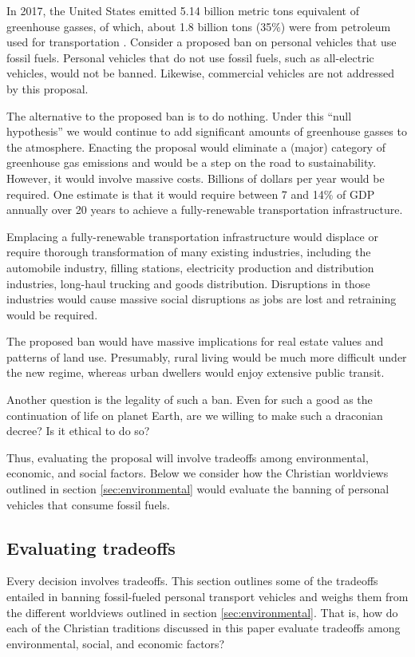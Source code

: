 \documentclass[12pt]{article}
\begin{document}
In 2017, the United States emitted 5.14 billion metric tons equivalent of greenhouse gasses, of which, 
about 1.8 billion tons (35\%) were from petroleum used for transportation \cite{EIA2017}.
Consider a proposed ban on personal vehicles that use fossil fuels.
Personal vehicles that do not use fossil fuels, such as all-electric vehicles, would not be banned. 
Likewise, commercial vehicles are not addressed by this proposal. %

The alternative to the proposed ban is to do nothing. 
Under this ``null hypothesis'' we would continue to add significant amounts of greenhouse gasses to the atmosphere.
Enacting the proposal would eliminate a (major) category of greenhouse gas emissions and would be a step on the road to sustainability.
However, it would involve massive costs. Billions of dollars per year would be required. 
One estimate is that it would require between 7 and 14\% of GDP annually 
over 20 years to achieve a fully-renewable transportation infrastructure.

Emplacing a fully-renewable transportation infrastructure 
would displace or require thorough transformation of many existing industries, 
including the automobile industry,  filling stations, 
electricity production and distribution industries, 
long-haul trucking and goods distribution. %
Disruptions in those industries 
would cause massive social disruptions 
as jobs are lost and retraining would be required.

The proposed ban would have massive implications for real estate values 
and patterns of land use. 
Presumably, rural living would be much more difficult under the new regime,
whereas urban dwellers would enjoy extensive public transit.

Another question is the legality of such a ban. 
Even for such a good as the continuation of life on planet Earth,
are we willing to make such a draconian decree? Is it ethical to do so?

Thus, evaluating the proposal will involve tradeoffs among environmental, economic, and social factors.
Below we consider how the Christian worldviews outlined in section \ref{sec:environmental}
would evaluate the banning of personal vehicles that consume fossil fuels.


\subsection{Evaluating tradeoffs}
\label{sec:evaluating_tradeoffs}
Every decision involves tradeoffs. This section outlines some of the tradeoffs entailed in banning fossil-fueled personal transport vehicles 
and weighs them from the different worldviews outlined in section \ref{sec:environmental}.
That is, how do each of the Christian traditions discussed in this paper 
evaluate tradeoffs among environmental, social, and economic factors?
\end{document}

